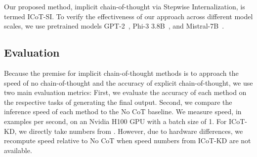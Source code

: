 \documentclass{article}
\newcommand{\icotsi}{{ICoT-SI}}
\newcommand{\icotkd}{{ICoT-KD}}
\begin{document}
Our proposed method, implicit chain-of-thought via Stepwise Internalization, is termed \icotsi. To verify the effectiveness of our approach across different model scales, we use pretrained models GPT-2~\citep{radford2019language}, Phi-3 3.8B~\citep{abdin2024phi3}, and Mistral-7B~\citep{jiang2023mistral}.

\subsection{Evaluation}
Because the premise for implicit chain-of-thought methods is to approach the speed of no chain-of-thought and the accuracy of explicit chain-of-thought, we use two main evaluation metrics: First, we evaluate the accuracy of each method on the respective tasks of generating the final output. Second, we compare the inference speed of each method to the No CoT baseline. We measure speed, in examples per second, on an Nvidia H100 GPU with a batch size of 1. For \icotkd, we directly take numbers from \citet{deng2023implicit}. However, due to hardware differences, we recompute speed relative to No CoT when speed numbers from \icotkd{} are not available.

\end{document}
